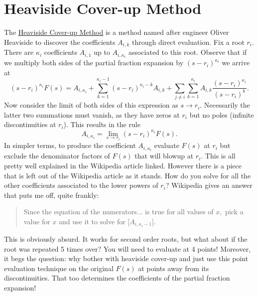 \section{Heaviside Cover-up Method}
The \href{https://en.wikipedia.org/wiki/Heaviside_cover-up_method}{Heaviside Cover-up Method} is a method named after engineer Oliver Heaviside to discover the coefficients \(A_{i, k}\) through direct evaluation.
Fix a root \(r_i.\)
There are \(\kappa_i\) coefficients \(A_{i, 1}\) up to \(A_{i, \kappa_i}\) associated to this root.
Observe that if we multiply both sides of the partial fraction expansion by \((s - r_i)^{\kappa_i}\) we arrive at
\[
  (s - r_i)^{\kappa_i} F(s)
    =
    A_{i, \kappa_i}
    +
    \sum_{k=1}^{\kappa_i - 1} (s - r_i)^{\kappa_i - k} A_{i, k}
    +
    \sum_{j\neq i} \sum_{k = 1}^{\kappa_i} A_{i, k} \frac{(s - r_i)^{\kappa_i}}{(s - r_i)^k}.
\]
Now consider the limit of both sides of this expression as \(s\to r_i.\)
Necessarily the latter two summations must vanish, as they have zeros at \(r_i\) but no poles (infinite discontinuities at \(r_i\)).
This results in the rule
\[
  A_{i, \kappa_i} = \lim_{s \to r_i} (s - r_i)^{\kappa_i} F(s).
\]
In simpler terms, to produce the coefficient \(A_{i, \kappa_i}\) evaluate \(F(s)\) at \(r_i\) but exclude the denominator factors of \(F(s)\) that will blowup at \(r_i.\)
This is all pretty well explained in the Wikipedia article linked.
However there is a piece that is left out of the Wikipedia article as it stands.
How do you solve for all the other coefficients associated to the lower powers of \(r_i\)?
Wikipedia gives an answer that puts me off, quite frankly:
\begin{quote}
  Since the equation of the numerators... is true for all values of \(x,\) pick a value for \(x\) and use it to solve for [\(A_{i, \kappa_i - 1}\)].
\end{quote}
This is obviously absurd. 
It works for second order roots, but what about if the root was repeated 5 times over?
You will need to evaluate at 4 points!
Moreover, it begs the question: why bother with heaviside cover-up and just use this point evaluation technique on the original \(F(s)\) at points away from its discontinuities.
That too determines the coefficients of the partial fraction expansion!

